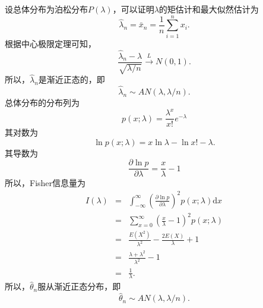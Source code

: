 \begin{example}
    设总体分布为泊松分布$P(\lambda)$，可以证明${\lambda}$的矩估计和最大似然估计为
    $$
    \hat{\lambda}_n = \bar{x}_n = \frac{1}{n} \sum_{i=1}^n x_i.
    $$
    根据中心极限定理可知，
    $$
    \frac{\hat{\lambda}_n - \lambda}{\sqrt{\lambda /n}} \overset{L}{\longrightarrow} N(0,1).
    $$
    所以，$\hat{\lambda}_n$是渐近正态的，即
    $$
    \hat{\lambda}_n \sim AN(\lambda, \lambda/n).
    $$
    总体分布的分布列为
    $$
    p(x;\lambda) = \frac{\lambda^x}{x!} e^{-\lambda}
    $$
    其对数为
    $$
    \ln p(x;\lambda) = x \ln \lambda - \ln x! - \lambda.
    $$
    其导数为
    $$
    \frac{\partial \ln p}{\partial \lambda} = \frac{x}{\lambda} -1
    $$
    所以，Fisher信息量为
    \begin{eqnarray*}
        I(\lambda) &=& \int_{-\infty}^{\infty} \left(\frac{\partial \ln p}{\partial \lambda}\right)^2 p(x;\lambda) \text{d}x \\
        &=& \sum_{x=0}^{\infty} \left( \frac{x}{\lambda} -1\right)^2 p(x;\lambda) \\
        &=& \frac{E(X^2)}{\lambda^2} - \frac{2E(X)}{\lambda} +1 \\
        &=& \frac{\lambda + \lambda^2}{\lambda^2} - 1 \\
        &=& \frac{1}{\lambda}.
    \end{eqnarray*}
    所以，$\hat{\theta}_n$服从渐近正态分布，即
    $$
    \hat{\theta}_n \sim AN (\lambda, \lambda/n).
    $$
\end{example}





